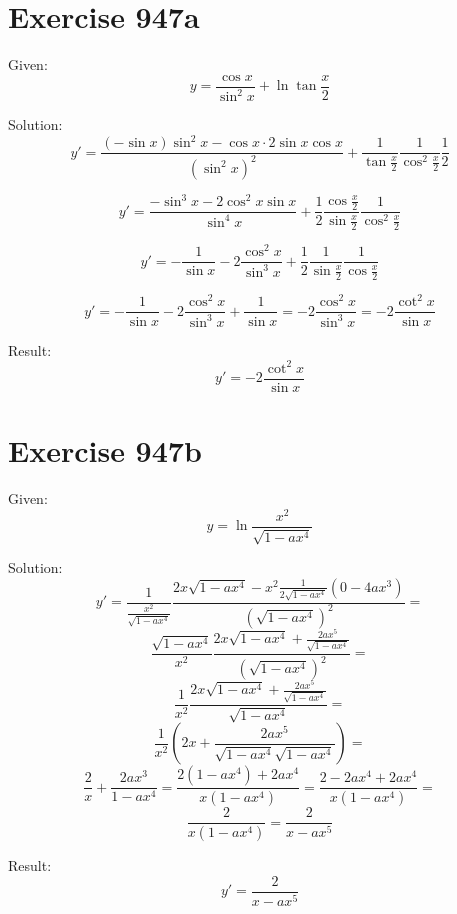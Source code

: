 \documentclass[a4paper, 10pt]{scrartcl}
\begin{document}
\section{Exercise 947a}

Given:
\[
y = \frac{\cos{x}}{\sin^{2}{x}} + \ln{\tan{\frac{x}{2}}}
\]

Solution:
\[
y' = \frac{(-\sin{x})\sin^{2}{x} - \cos{x}\cdot 2\sin{x}\cos{x}}{(\sin^{2}{x})^{2}} +
    \frac{1}{\tan{\frac{x}{2}}}\frac{1}{\cos^{2}{\frac{x}{2}}}\frac{1}{2}
\]

\[
y' = \frac{-\sin^{3}{x} - 2\cos^{2}{x}\sin{x}}{\sin^{4}{x}} +
    \frac{1}{2}\frac{\cos{\frac{x}{2}}}{\sin{\frac{x}{2}}}\frac{1}{\cos^{2}{\frac{x}{2}}}
\]

\[
y' = -\frac{1}{\sin{x}} - 2\frac{\cos^{2}{x}}{\sin^{3}{x}} +
    \frac{1}{2}\frac{1}{\sin{\frac{x}{2}}}\frac{1}{\cos{\frac{x}{2}}}
\]

\[
y' = -\frac{1}{\sin{x}} - 2\frac{\cos^{2}{x}}{\sin^{3}{x}} +
    \frac{1}{\sin{x}} = -2\frac{\cos^{2}{x}}{\sin^{3}{x}} = -2\frac{\cot^{2}{x}}{\sin{x}}
\]

Result:
\[
y' = -2\frac{\cot^{2}{x}}{\sin{x}}
\]

\section{Exercise 947b}

Given:
\[
y = \ln{\frac{x^{2}}{\sqrt{1 - ax^{4}}}}
\]

Solution:
\[
y' = \frac{1}{\frac{x^{2}}{\sqrt{1 - ax^{4}}}}\frac{2x\sqrt{1 - ax^{4}} - x^{2}\frac{1}{2\sqrt{1 - ax^{4}}}(0 - 4ax^{3})}{(\sqrt{1 - ax^{4}})^{2}} =
\]
\[
\frac{\sqrt{1 - ax^{4}}}{x^{2}}\frac{2x\sqrt{1 - ax^{4}} + \frac{2ax^{5}}{\sqrt{1 - ax^{4}}}}{(\sqrt{1 - ax^{4}})^{2}} =
\]
\[
\frac{1}{x^{2}}\frac{2x\sqrt{1 - ax^{4}} + \frac{2ax^{5}}{\sqrt{1 - ax^{4}}}}{\sqrt{1 - ax^{4}}} =
\]
\[
\frac{1}{x^{2}}\left(2x + \frac{2ax^{5}}{\sqrt{1 - ax^{4}}\sqrt{1 - ax^{4}}}\right) =
\]
\[
\frac{2}{x} + \frac{2ax^{3}}{1 - ax^{4}} = \frac{2(1 - ax^{4}) + 2ax^{4}}{x(1 - ax^{4})} = \frac{2 - 2ax^{4} + 2ax^{4}}{x(1 - ax^{4})} =
\]
\[
\frac{2}{x(1 - ax^{4})} = \frac{2}{x - ax^{5}}
\]

Result:
\[
y' = \frac{2}{x - ax^{5}}
\]
\end{document}
